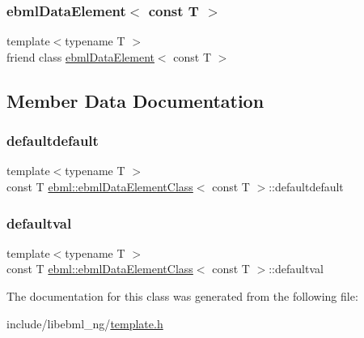\subsubsection{\texorpdfstring{ebml\+Data\+Element$<$ const T $>$}{ebmlDataElement< const T >}}
{\footnotesize\ttfamily template$<$typename T $>$ \\
friend class \mbox{\hyperlink{classebml_1_1ebmlDataElement}{ebml\+Data\+Element}}$<$ const T $>$\hspace{0.3cm}{\ttfamily [friend]}}



\subsection{Member Data Documentation}
\mbox{\label{classebml_1_1ebmlDataElementClass_3_01const_01T_01_4_a4b0000068ea1cd6b05a45b038e47c436}} 
\subsubsection{\texorpdfstring{defaultdefault}{defaultdefault}}
{\footnotesize\ttfamily template$<$typename T $>$ \\
const T \mbox{\hyperlink{classebml_1_1ebmlDataElementClass}{ebml\+::ebml\+Data\+Element\+Class}}$<$ const T $>$\+::defaultdefault\hspace{0.3cm}{\ttfamily [static]}}

\mbox{\label{classebml_1_1ebmlDataElementClass_3_01const_01T_01_4_aea8b5f04ffa6327c211e20171d75fdcd}} 
\subsubsection{\texorpdfstring{defaultval}{defaultval}}
{\footnotesize\ttfamily template$<$typename T $>$ \\
const T \mbox{\hyperlink{classebml_1_1ebmlDataElementClass}{ebml\+::ebml\+Data\+Element\+Class}}$<$ const T $>$\+::defaultval}



The documentation for this class was generated from the following file\+:\begin{DoxyCompactItemize}
\item 
include/libebml\+\_\+ng/\mbox{\hyperlink{template_8h}{template.\+h}}\end{DoxyCompactItemize}

